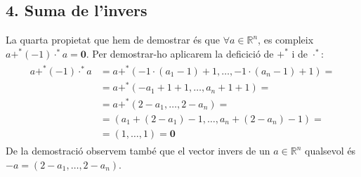 \documentclass[a4paper, 9pt]{article}
\begin{document}
    \subsection*{4. Suma de l'invers}
        La quarta propietat que hem de demostrar \'es que ${\forall a \in \mathbb{R}^n}$, es compleix ${a +^* (-1)\cdot^*a = \mathbf{0}}$. Per demostrar-ho aplicarem la deficici\'o de ${+^*}$ i de ${\cdot^*}$:
        \begin{align*}
            \begin{aligned}
                a+^*(-1)\cdot^*a &= a +^* (-1\cdot(a_1-1)+1,\dots,-1\cdot(a_n-1)+1) =\\ 
                                 &= a +^* (-a_1+1+1,\dots,a_n+1+1) =\\ 
                                 &= a +^* (2-a_1,\dots,2-a_n) =\\
                                 &= (a_1+(2-a_1)-1,\dots,a_n+(2-a_n)-1) =\\
                                 &= (1,\dots,1) = \mathbf{0}
            \end{aligned}
        \end{align*}
        De la demostraci\'o observem tamb\'e que el vector invers de un ${a \in \mathbb{R}^n}$ qualsevol \'es ${-a = (2-a_1,\dots,2-a_n)}$.
\end{document}

